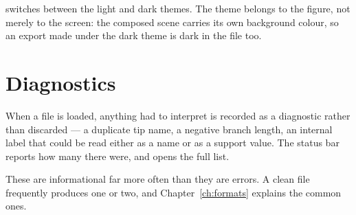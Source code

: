  switches between the light and dark themes. The theme belongs to
the figure, not merely to the screen: the composed scene carries its own
background colour, so an export made under the dark theme is dark in the file
too.


\section{Diagnostics}

When a file is loaded, anything \app{} had to interpret is recorded as a
diagnostic rather than discarded --- a duplicate tip name, a negative branch
length, an internal label that could be read either as a name or as a support
value. The status bar reports how many there were, and  opens the
full list.

These are informational far more often than they are errors. A clean file
frequently produces one or two, and Chapter~\ref{ch:formats} explains the common
ones.
